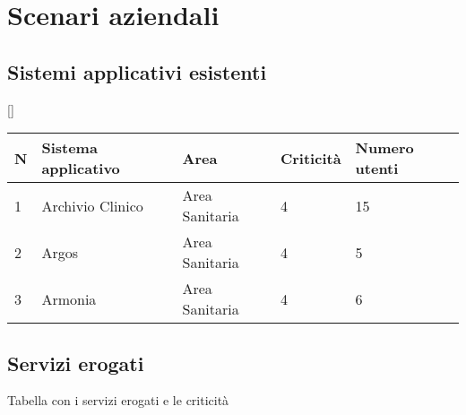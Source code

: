 \section{Scenari aziendali}
	\subsection{Sistemi applicativi esistenti}

\begin{table}{}[]
	\begin{tabular}{|l|l|l|l|l|}
		\hline
		\rowcolor[HTML]{EFEFEF} 
		\textbf{N} & \textbf{Sistema applicativo} & \textbf{Area} & \textbf{Criticità} & \textbf{Numero utenti} \\ \hline
		1          & Archivio Clinico                             & Area Sanitaria              & 4                       & 15          \\ \hline
		2          & Argos                             & Area Sanitaria              & 4                       & 5          \\ \hline
		3          & Armonia                             & Area Sanitaria              & 4                       & 6          \\ \hline
	\end{tabular}
\end{table}
	
	
	\subsection{Servizi erogati}
	Tabella con i servizi erogati e le criticità
	